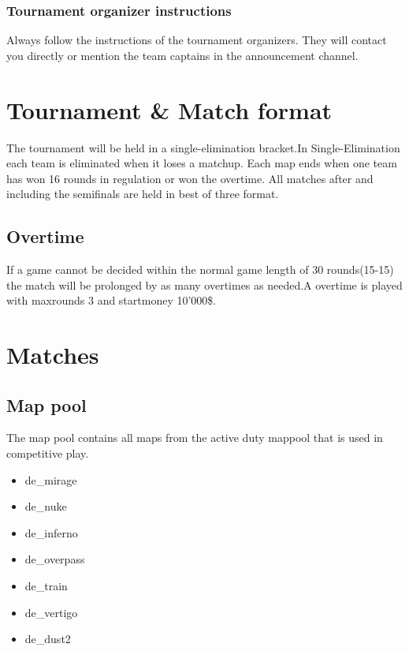 \documentclass{article}
\begin{document}
\subsubsection{Tournament organizer instructions}
Always follow the instructions of the tournament organizers.
They will contact you directly or mention the team captains in the announcement channel.

\section{Tournament \& Match format}
The tournament will be held in a single-elimination bracket.In Single-Elimination each team is eliminated when it loses a matchup.
Each map ends when one team has won 16 rounds in regulation or won the overtime. All matches after and including the semifinals are held in best of three format. 

\subsection{Overtime}
If a game cannot be decided within the normal game length of 30 rounds(15-15) the match will be prolonged by as many overtimes as needed.A overtime is played with maxrounds 3 and startmoney 10’000\$.


\section{Matches}

\subsection{Map pool}
The map pool contains all maps from the active duty mappool that is used in competitive play.
\begin{itemize}
  \item de\_mirage
  \item de\_nuke
  \item de\_inferno
  \item de\_overpass
  \item de\_train
  \item de\_vertigo
  \item de\_dust2
\end{itemize}
\end{document}
